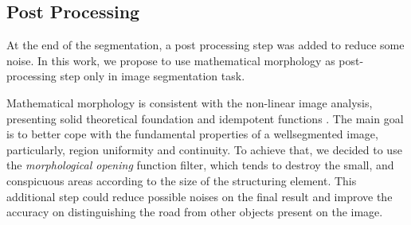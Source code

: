 \subsection{Post Processing}
\label{cap6_pos_processamento}

At the end of the segmentation, a post processing step was added to reduce some noise.
In this work, we propose to use mathematical morphology as post-processing step only in image segmentation task.

Mathematical morphology is consistent with the non-linear image analysis, presenting solid theoretical foundation and idempotent functions \cite{Najman:2013}.
The main goal is to better cope with the fundamental properties of a wellsegmented image, particularly, region uniformity and continuity. To achieve that, we decided to use the \textit{morphological opening} function filter, which tends to destroy the small, and conspicuous areas according to the size of the structuring element.
This additional step could reduce possible noises on the final result and improve the accuracy on distinguishing the road from other objects present on the image.

